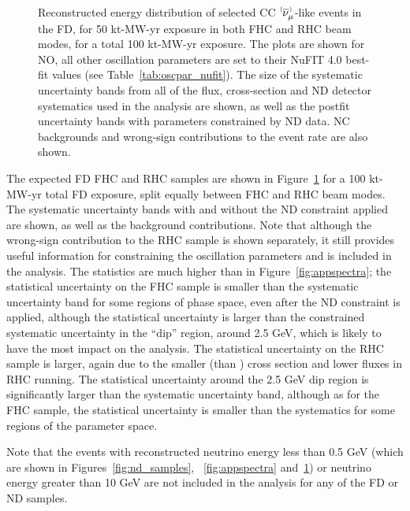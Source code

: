 \begin{figure}[htbp]
  \\
\caption{Reconstructed energy distribution of selected CC $\;\nu^{\bracketbar}_{\mu}$-like events in the FD, for 50 kt-MW-yr exposure in both FHC and RHC beam modes, for a total 100 kt-MW-yr exposure. The plots are shown for NO, all other oscillation parameters are set to their NuFIT 4.0 best-fit values (see Table~\ref{tab:oscpar_nufit}). The size of the systematic uncertainty bands from all of the flux, cross-section and ND detector systematics used in the analysis are shown, as well as the postfit uncertainty bands with parameters constrained by ND data. NC backgrounds and wrong-sign contributions to the event rate are also shown.}
\label{fig:disspectra}
\end{figure}
The expected FD FHC \numu and RHC \anumu samples are shown in Figure~\ref{fig:disspectra} for a 100 kt-MW-yr total FD exposure, split equally between FHC and RHC beam modes. The systematic uncertainty bands with and without the ND constraint applied are shown, as well as the background contributions. Note that although the wrong-sign \numu contribution to the RHC \anumu sample is shown separately, it still provides useful information for constraining the oscillation parameters and is included in the analysis. The statistics are much higher than in Figure~\ref{fig:appspectra}; the statistical uncertainty on the \numu FHC sample is smaller than the systematic uncertainty band for some regions of phase space, even after the ND constraint is applied, although the statistical uncertainty is larger than the constrained systematic uncertainty in the ``dip'' region, around 2.5 GeV, which is likely to have the most impact on the analysis. The statistical uncertainty on the \anumu RHC sample is larger, again due to the smaller \anumu (than \numu) cross section and lower fluxes in RHC running. The statistical uncertainty around the 2.5 GeV dip region is significantly larger than the systematic uncertainty band, although as for the FHC \numu sample, the statistical uncertainty is smaller than the systematics for some regions of the parameter space.

Note that the events with reconstructed neutrino energy less than 0.5 GeV (which are shown in Figures~\ref{fig:nd_samples}, ~\ref{fig:appspectra} and~\ref{fig:disspectra}) or neutrino energy greater than 10 GeV are not included in the analysis for any of the FD or ND samples.



